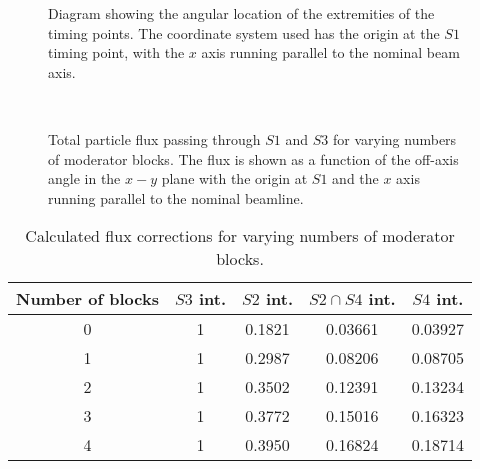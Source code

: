 \begin{figure}[h]
  \begin{minipage}{0.49\textwidth}
    \begin{adjustbox}{max totalsize={\textwidth}{.5\textheight}}
      
    \end{adjustbox}
    \centering
    \caption{Diagram showing the angular location of the extremities of the timing points. The coordinate system used has the origin at the $\mathit{S1}$ timing point, with the $x$ axis running parallel to the nominal beam axis.}
    \label{fig:beamAng}
  \end{minipage}
  \hfill
  \begin{minipage}{0.49\textwidth}
    \begin{adjustbox}{max totalsize={\textwidth}{0.5\textheight}, center}
      
    \end{adjustbox}
    \caption{Total particle flux passing through $\mathit{S1}$ and $\mathit{S3}$ for varying numbers of moderator blocks. The flux is shown as a function of the off-axis angle in the $x-y$ plane with the origin at $\mathit{S1}$ and the $x$ axis running parallel to the nominal beamline.}
    \label{fig:s1s3all}
  \end{minipage}
  \
\end{figure}

\begin{table}
  \centering
  \begin{tabular}{|c|c|c|c|c|}
    \hline
    Number of blocks & $\mathit{S3}$ int. & $\mathit{S2}$ int. & $\mathit{S2} \cap \mathit{S4}$ int. & $\mathit{S4}$ int. \\
    \hline
    0 & 1 & 0.1821 & 0.03661 & 0.03927 \\
    1 & 1 & 0.2987 & 0.08206 & 0.08705 \\
    2 & 1 & 0.3502 & 0.12391 & 0.13234 \\
    3 & 1 & 0.3772 & 0.15016 & 0.16323 \\
    4 & 1 & 0.3950 & 0.16824 & 0.18714 \\
    \hline		
  \end{tabular}
  \caption{Calculated flux corrections for varying numbers of moderator blocks.}
  \label{tab:fluxFactors}
\end{table}
    
